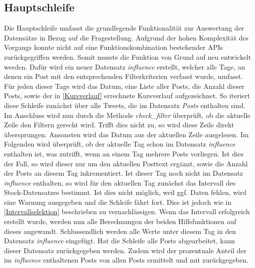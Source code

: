 \documentclass{article}
\begin{document}
\subsection{Hauptschleife} \label{Hauptschleife}
Die Hauptschleife umfasst die grundlegende Funktionalität zur Auswertung der Datensätze in Bezug auf die Fragestellung.
Aufgrund der hohen Komplexität des Vorgangs konnte nicht auf eine Funktionskombination bestehender APIs zurückgegriffen werden.
Somit musste die Funktion von Grund auf neu entwickelt werden.
Dafür wird ein neuer Datensatz \textit{influence} erstellt, welcher alle Tage, an denen ein Post mit den entsprechenden Filterkriterien verfasst wurde, umfasst.
Für jeden dieser Tage wird das Datum, eine Liste aller Posts, die Anzahl dieser Posts, sowie der in \ref{Kursverlauf} errechnete Kursverlauf aufgezeichnet.
So iteriert diese Schleife zunächst über alle Tweets, die im Datensatz \textit{Posts} enthalten sind.
Im Anschluss wird nun durch die Methode \textit{check\_filter} überprüft, ob die aktuelle Zeile den Filtern gerecht wird.
Trifft dies nicht zu, so wird diese Zeile direkt übersprungen.
Ansonsten wird das Datum aus der aktuellen Zeile ausgelesen.
Im Folgenden wird überprüft, ob der aktuelle Tag schon im Datensatz \textit{influence} enthalten ist, was zutrifft, wenn an einem Tag mehrere Posts vorliegen.
Ist dies der Fall, so wird dieser nur um den aktuellen Posttext ergänzt, sowie die Anzahl der Posts an diesem Tag inkrementiert.
Ist dieser Tag noch nicht im Datensatz \textit{influence} enthalten, so wird für den aktuellen Tag zunächst das Intervall des Stock-Datensatzes bestimmt.
Ist dies nicht möglich, weil ggf. Daten fehlen, wird eine Warnung ausgegeben und die Schleife fährt fort.
Dies ist jedoch wie in \ref{Intervallselektion} beschrieben zu vernachlässigen.
Wenn das Intervall erfolgreich erstellt wurde, werden nun alle Berechnungen der beiden Hilfsfunktionen auf dieses angewandt.
Schlussendlich werden alle Werte unter diesem Tag in den Datensatz \textit{influence} eingefügt.
Hat die Schleife alle Posts abgearbeitet, kann dieser Datensatz zurückgegeben werden.
Zudem wird der prozentuale Anteil der im \textit{influence} enthaltenen Posts von allen Posts ermittelt und mit zurückgegeben.
\newpage
\end{document}
